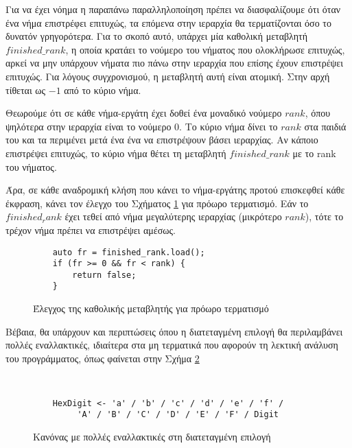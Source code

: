 Για να έχει νόημα η παραπάνω παραλληλοποίηση πρέπει να διασφαλίζουμε ότι όταν ένα νήμα επιστρέφει επιτυχώς, τα επόμενα στην ιεραρχία θα τερματίζονται όσο το δυνατόν γρηγορότερα.
Για το σκοπό αυτό, υπάρχει μία καθολική μεταβλητή $finished\_rank$, η οποία κρατάει το νούμερο του νήματος που ολοκλήρωσε επιτυχώς, αρκεί να μην υπάρχουν νήματα πιο πάνω στην ιεραρχία που επίσης έχουν επιστρέψει επιτυχώς.
Για λόγους συγχρονισμού, η μεταβλητή αυτή είναι ατομική.
Στην αρχή τίθεται ως $-1$ από το κύριο νήμα.

Θεωρούμε ότι σε κάθε νήμα-εργάτη έχει δοθεί ένα μοναδικό νούμερο $rank$, όπου ψηλότερα στην ιεραρχία είναι το νούμερο $0$.
Το κύριο νήμα δίνει το $rank$ στα παιδιά του και τα περιμένει μετά ένα ένα να επιστρέψουν βάσει ιεραρχίας.
Αν κάποιο επιστρέψει επιτυχώς, το κύριο νήμα θέτει τη μεταβλητή $finished\_rank$ με το rank του νήματος.

Άρα, σε κάθε αναδρομική κλήση που κάνει το νήμα-εργάτης προτού επισκεφθεί κάθε έκφραση, κάνει τον έλεγχο του Σχήματος \ref{fig:top_down_2} για πρόωρο τερματισμό.
Εάν το $finished_rank$ έχει τεθεί από νήμα μεγαλύτερης ιεραρχίας (μικρότερο $rank$), τότε το τρέχον νήμα πρέπει να επιστρέψει αμέσως.

\begin{figure}[h]
\setlength\partopsep{-\topsep}%
\begin{verbatim}
    auto fr = finished_rank.load();
    if (fr >= 0 && fr < rank) { 
        return false;
    }
\end{verbatim}
\caption{Έλεγχος της καθολικής μεταβλητής για πρόωρο τερματισμό}
\label{fig:top_down_2}
\end{figure}


Βέβαια, θα υπάρχουν και περιπτώσεις όπου η διατεταγμένη επιλογή θα περιλαμβάνει πολλές εναλλακτικές, ιδιαίτερα στα μη τερματικά που αφορούν τη λεκτική ανάλυση του προγράμματος, όπως φαίνεται στην Σχήμα \ref{fig:top_down_4}

\begin{figure}[h]
\begin{Verbatim}


	HexDigit <- 'a' / 'b' / 'c' / 'd' / 'e' / 'f' / 
   		 'A' / 'B' / 'C' / 'D' / 'E' / 'F' / Digit
\end{Verbatim}
\caption{Κανόνας με πολλές εναλλακτικές στη διατεταγμένη επιλογή}
\label{fig:top_down_4}
\end{figure}

